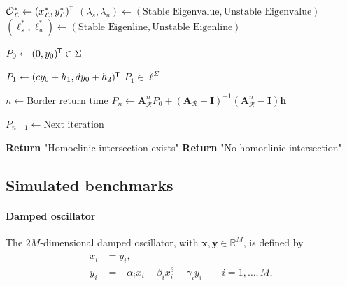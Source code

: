 \documentclass{article}
\theoremstyle{example}
\theoremstyle{plain}
\theoremstyle{definition}
\theoremstyle{remark}
\def\vh{{\bm{h}}}
\def\mA{{\bm{A}}}
\def\mI{{\bm{I}}}
\newcommand*{\tran}{^{\mkern-1.5mu\mathsf{T}}}
\begin{document}
\begin{algorithm}[H]
\caption{Investigating Homoclinic Intersections in 2D}
\label{alg:homoclinic}
\begin{algorithmic}[1]
    \State $\mathcal{O}^{*}_{\mathcal{L}} \gets (x^{*}_{\mathcal{L}}, y^{*}_{\mathcal{L}})\tran$ 
    \State $(\lambda_s, \lambda_u) \gets (\text{Stable Eigenvalue}, \text{Unstable Eigenvalue})$
    \State $(\boldsymbol\ell^{*}_{s}, \boldsymbol\ell^{*}_{u}) \gets (\text{Stable Eigenline}, \text{Unstable Eigenline})$

    \State $P_0 \gets (0, y_0)\tran \in \Sigma$ 

    \State $P_1 \gets (c y_0 + h_1, d y_0 + h_2)\tran$ 
%   
        \State $P_1 \in \boldsymbol\ell^{\Sigma}$ 

    \State $n \gets \text{Border return time}$ 
    \State $P_n \gets \mA_{\mathcal{R}}^n P_0 + (\mA_{\mathcal{R}}-\mI)^{-1} (\mA_{\mathcal{R}}^n-\mI) \vh$ 

    \State $P_{n+1} \gets \text{Next iteration}$ 

        \State \textbf{Return} "Homoclinic intersection exists"
    \Else
        \State \textbf{Return} "No homoclinic intersection"
    \EndIf
\EndProcedure
\end{algorithmic}
\end{algorithm}
\subsection{Simulated benchmarks}
\paragraph{Damped oscillator}
The $2M$-dimensional damped oscillator, with $\bm{x},\bm{y} \in \mathbb{R}^M$, is defined by 
\begin{align}
    \dot{x}_i &= y_i, \\[6pt]
    \dot{y}_i &= -\alpha_i x_i - \beta_i x_i^{3} - \gamma_i y_i
    \qquad i = 1,\dots,M,
\end{align}
\end{document}
